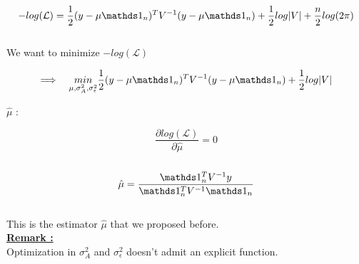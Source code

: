 \documentclass[unknownkeysallowed]{beamer}
\begin{document}
\begin{frame}
\begin{itemize}\setlength{\itemsep}{5pt}
 \\

$$-log(\mathcal{L}) = \frac12(y - \mu\bbI_{n})^{T} V^{-1}(y - \mu\bbI_{n}) + \frac12 log \lvert V \rvert + \frac{n}{2}log(2\pi)$$\\
We want to minimize $-log(\mathcal{L})$

$$\Longrightarrow\quad \underset{\mu,\sigma_{A}^{2},\sigma_{\epsilon}^{2}}{min} \frac12 (y - \mu\bbI_{n})^{T} V^{-1} (y - \mu\bbI_{n}) + \frac12 log \lvert V \rvert$$
\end{itemize}
\end{frame}


\begin{frame}

\begin{itemize}\setlength{\itemsep}{5pt}
 $\hat\mu$ :

$$\dfrac{\partial log(\mathcal{L})}{\partial \hat\mu} = 0$$
\\
\Longleftrightarrow\quad $$\hat{\mu} = \dfrac{\bbI_{n}^{T}V^{-1}y}{\bbI_{n}^{T}V^{-1}\bbI_{n}}$$\\

\vspace{0.5cm}
This is the estimator $\hat\mu$ that we proposed before.\\
\vspace{0.5cm}
\underline{\textbf{Remark :}}\\
\vspace{0.2cm}
Optimization in $\sigma_{A}^{2}$ and $\sigma_{\epsilon}^{2}$ doesn't admit an explicit function.
\end{itemize}
\end{frame}
\end{document}
